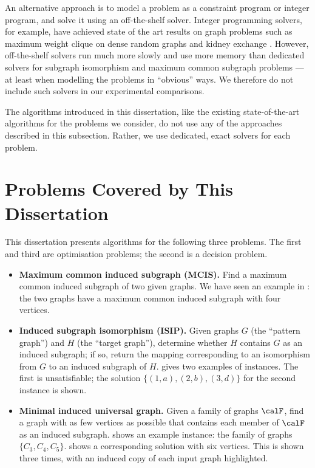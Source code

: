 An alternative approach is to model a problem as a constraint program or integer
program, and solve it using an off-the-shelf solver.
Integer programming solvers, for example,
have achieved state of the art results on graph problems such as maximum
weight clique on dense random graphs \citep{DBLP:journals/cor/SegundoFA19}
and kidney exchange \citep{DBLP:conf/sigecom/DickersonMPST16}.
However, off-the-shelf solvers run much more slowly and use more memory
than dedicated solvers for subgraph isomorphism and maximum common subgraph
problems
\citep{mccreesh2017solving,trimble2018three} --- at least
when modelling the problems in ``obvious'' ways. We therefore do
not include such solvers in our experimental comparisons.

The algorithms introduced in this dissertation, like the existing state-of-the-art
algorithms for the problems we consider, do not use any of the approaches
described in this subsection.
Rather, we use dedicated, exact solvers for each problem.

\section{Problems Covered by This Dissertation}\label{sec:problems}

This dissertation presents algorithms for the following three problems.
The first and third are optimisation problems; the second
is a decision problem.

\begin{itemize}
    \item \textbf{Maximum common induced subgraph (MCIS).} Find
a maximum common induced subgraph of two given graphs.  We have seen an example
in : the two graphs have a maximum common induced subgraph
with four vertices.
    \item \textbf{Induced subgraph isomorphism (ISIP).} Given graphs $G$ (the ``pattern graph'')
    and $H$ (the ``target graph''),
determine whether $H$ contains $G$ as an induced subgraph;
if so, return the mapping corresponding to an isomorphism from $G$ to an
        induced subgraph of $H$.
     gives two examples of instances. The first is unsatisfiable;
        the solution $\{(1,a),(2,b), (3,d)\}$ for the second instance is shown.
    \item \textbf{Minimal induced universal graph.} Given a family of graphs $\calF$,
find a graph with as few vertices as possible that contains each member of $\calF$
as an induced subgraph.
     shows an example instance: the family
        of graphs $\{C_3, C_4, C_5\}$.  
     shows a corresponding solution with six vertices.
        This is shown three times, with an induced copy of each input graph
        highlighted.
\end{itemize}

